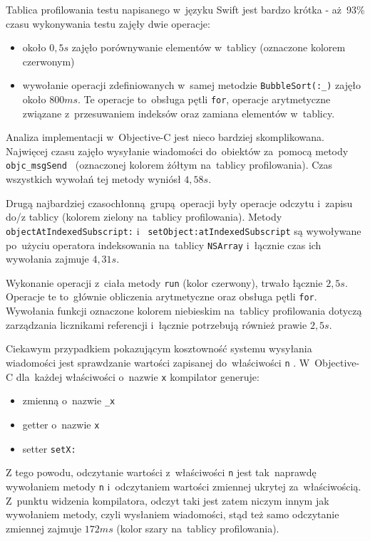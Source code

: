 \documentclass[mgr, shortabstract]{iithesis}
\newcommand{\swiftinline}[1]{
    \texttt{#1}
}
\newcommand{\objcinline}[1]{
    \texttt{#1}
}
\begin{document}
Tablica profilowania testu napisanego w~języku Swift jest bardzo krótka - aż~93\% czasu wykonywania testu zajęły dwie operacje:

\begin{itemize}
    \item około $0,5s$ zajęło porównywanie elementów w~tablicy (oznaczone kolorem czerwonym)
    \item wywołanie operacji zdefiniowanych w~samej metodzie \swiftinline{BubbleSort(:_)} zajęło około $800 ms$. Te operacje to~obsługa pętli \texttt{for}, operacje arytmetyczne związane z~przesuwaniem indeksów oraz zamiana elementów w~tablicy.
\end{itemize}

Analiza implementacji w~Objective-C jest nieco bardziej skomplikowana. Najwięcej czasu zajęło wysyłanie wiadomości do~obiektów za~pomocą metody \objcinline{objc_msgSend } (oznaczonej kolorem żółtym na~tablicy profilowania). Czas wszystkich wywołań tej metody wyniósł $4,58s$.

Drugą najbardziej czasochłonną grupą operacji były operacje odczytu i~zapisu do/z tablicy (kolorem zielony na~tablicy profilowania). Metody \objcinline{objectAtIndexedSubscript:} i~\objcinline{setObject:atIndexedSubscript} są wywoływane po~użyciu operatora indeksowania na~tablicy \objcinline{NSArray} i~łącznie czas ich wywołania zajmuje $4,31s$.

Wykonanie operacji z~ciała metody \objcinline{run} (kolor czerwony), trwało łącznie $2,5s$. Operacje te to~głównie obliczenia arytmetyczne oraz obsługa pętli \texttt{for}. Wywołania funkcji oznaczone kolorem niebieskim na~tablicy profilowania dotyczą zarządzania licznikami referencji i~łącznie potrzebują  również prawie $2,5s$.

Ciekawym przypadkiem pokazującym kosztowność systemu wysyłania wiadomości jest sprawdzanie wartości zapisanej do~właściwości \objcinline{n}. W~Objective-C dla~każdej właściwości o~nazwie \objcinline{x} kompilator generuje:

\begin{itemize}
    \item zmienną o~nazwie \objcinline{_x}
    \item getter o~nazwie \objcinline{x}
    \item setter \objcinline{setX:}
\end{itemize}

Z tego powodu, odczytanie wartości z~właściwości  \objcinline{n} jest tak~naprawdę wywołaniem metody \objcinline{n} i~odczytaniem wartości zmiennej ukrytej za~właściwością. Z~punktu widzenia kompilatora, odczyt taki jest zatem niczym innym jak wywołaniem metody, czyli wysłaniem wiadomości, stąd też samo odczytanie zmiennej zajmuje $172ms$ (kolor szary na~tablicy profilowania).
\end{document}
